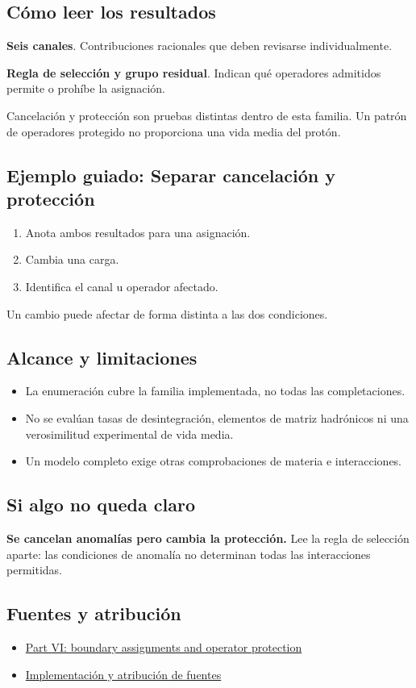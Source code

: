 \documentclass[11pt,a4paper]{article}
\begin{document}
\subsection*{Cómo leer los resultados}
\textbf{Seis canales}. Contribuciones racionales que deben revisarse individualmente.

\textbf{Regla de selección y grupo residual}. Indican qué operadores admitidos permite o prohíbe la asignación.

Cancelación y protección son pruebas distintas dentro de esta familia. Un patrón de operadores protegido no proporciona una vida media del protón.
\subsection*{Ejemplo guiado: Separar cancelación y protección}
\begin{enumerate}
\item Anota ambos resultados para una asignación.
\item Cambia una carga.
\item Identifica el canal u operador afectado.
\end{enumerate}
Un cambio puede afectar de forma distinta a las dos condiciones.
\subsection*{Alcance y limitaciones}
\begin{itemize}
\item La enumeración cubre la familia implementada, no todas las completaciones.
\item No se evalúan tasas de desintegración, elementos de matriz hadrónicos ni una verosimilitud experimental de vida media.
\item Un modelo completo exige otras comprobaciones de materia e interacciones.
\end{itemize}
\subsection*{Si algo no queda claro}
\textbf{Se cancelan anomalías pero cambia la protección.} Lee la regla de selección aparte: las condiciones de anomalía no determinan todas las interacciones permitidas.

\subsection*{Fuentes y atribución}
\begin{itemize}
\item \href{https://karlesmarin.github.io/ghu-explorer/papers/part-vi/index.html}{Part VI: boundary assignments and operator protection}
\item \href{https://github.com/karlesmarin/ghu-lab/blob/main/src/sections/escape_section.js}{Implementación y atribución de fuentes}
\end{itemize}
\end{document}
